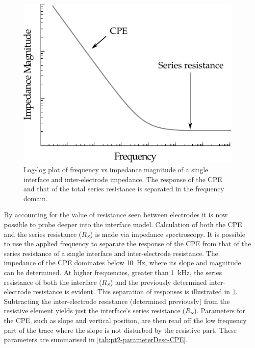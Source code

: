     \begin{figure}[h]
      \centering
      \includegraphics{content/pt2/07-InterfaceModel/graphics/graph_cpePlotGeneral}
      \caption{\label{fig:pt2-graph_cpePlotGeneral}Log-log plot of frequency vs impedance magnitude of a single interface and inter-electrode impedance. The response of the CPE and that of the total series resistance is separated in the frequency domain.}
    \end{figure}
    By accounting for the value of resistance seen between electrodes it is now possible to probe deeper into the interface model.
    Calculation of both the CPE and the series resistance ($R_S$) is made via impedance spectroscopy.
    It is possible to use the applied frequency to separate the response of the CPE from that of the series resistance of a single interface and inter-electrode resistance.
    The impedance of the CPE dominates below \SI{10}{\hertz}, where its slope and magnitude can be determined.
    At higher frequencies, greater than \SI{1}{\kilo\hertz}, the series resistance of both the interface ($R_S$) and the previously determined inter-electrode resistance is evident.
    This separation of responses is illustrated in \cref{fig:pt2-graph_cpePlotGeneral}.
    Subtracting the inter-electrode resistance (determined previously) from the resistive element yields just the interface's series resistance ($R_S$).
    Parameters for the CPE, such as slope and vertical position, are then read off the low frequency part of the trace where the slope is not disturbed by the resistive part.
    These parameters are summarised in \cref{tab:pt2-parameterDesc-CPE}.

